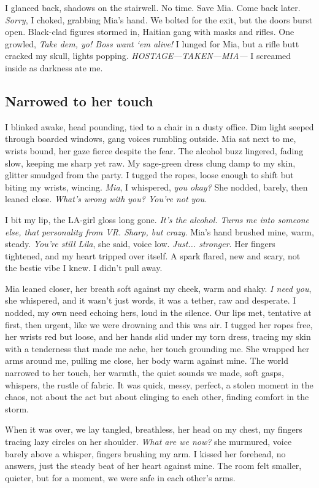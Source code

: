 \documentclass[12pt,oneside]{book} %
\begin{document}
I glanced back, shadows on the stairwell. No time. Save Mia. Come back later. \textit{Sorry}, I choked, grabbing Mia’s hand. We bolted for the exit, but the doors burst open. Black-clad figures stormed in, Haitian gang with masks and rifles.  One growled, \textit{Take dem, yo! Boss want ‘em alive!} I lunged for Mia, but a rifle butt cracked my skull, lights popping. \textit{HOSTAGE—TAKEN—MIA—} I screamed inside as darkness ate me.

\subsection*{Narrowed to her touch}

I blinked awake, head pounding, tied to a chair in a dusty office. Dim light seeped through boarded windows, gang voices rumbling outside. Mia sat next to me, wrists bound, her gaze fierce despite the fear. The alcohol buzz lingered, fading slow, keeping me sharp yet raw. My sage-green dress clung damp to my skin, glitter smudged from the party. I tugged the ropes, loose enough to shift but biting my wrists, wincing. \textit{Mia}, I whispered, \textit{you okay?} She nodded, barely, then leaned close. \textit{What’s wrong with you? You’re not you.}

I bit my lip, the LA-girl gloss long gone. \textit{It’s the alcohol. Turns me into someone else, that personality from VR. Sharp, but crazy}. Mia’s hand brushed mine, warm, steady. \textit{You’re still Lila}, she said, voice low. \textit{Just... stronger}. Her fingers tightened, and my heart tripped over itself. A spark flared, new and scary, not the bestie vibe I knew. I didn’t pull away.

Mia leaned closer, her breath soft against my cheek, warm and shaky. \textit{I need you}, she whispered, and it wasn’t just words, it was a tether, raw and desperate. I nodded, my own need echoing hers, loud in the silence. Our lips met, tentative at first, then urgent, like we were drowning and this was air. I tugged her ropes free, her wrists red but loose, and her hands slid under my torn dress, tracing my skin with a tenderness that made me ache, her touch grounding me. She wrapped her arms around me, pulling me close, her body warm against mine. The world narrowed to her touch, her warmth, the quiet sounds we made, soft gasps, whispers, the rustle of fabric. It was quick, messy, perfect, a stolen moment in the chaos, not about the act but about clinging to each other, finding comfort in the storm.

When it was over, we lay tangled, breathless, her head on my chest, my fingers tracing lazy circles on her shoulder. \textit{What are we now?} she murmured, voice barely above a whisper, fingers brushing my arm. I kissed her forehead, no answers, just the steady beat of her heart against mine. The room felt smaller, quieter, but for a moment, we were safe in each other’s arms.
\end{document}
